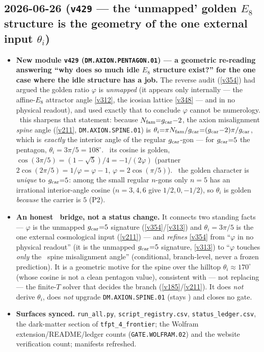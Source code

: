 \subsection*{2026-06-26 (\texttt{v429} --- the `unmapped' golden $E_8$ structure is the geometry of the one external input $\theta_i$)}
\begin{itemize}
\item \textbf{New module \texttt{v429} (\texttt{DM.AXION.PENTAGON.01}) --- a geometric re-reading answering
``why does so much idle $E_8$ structure exist?'' for the one case where the idle structure has a job.}
The reverse audit (\vref{v354}) had argued the golden ratio $\varphi$ is \emph{unmapped} (it appears only
internally --- the affine-$E_8$ attractor angle \vref{v312}, the icosian lattice \vref{v348} --- and in no
physical readout), and used exactly that to conclude $\varphi$ cannot be numerology. \mE\ this sharpens that
statement: because $N_{\mathrm{fam}}{=}g_{\mathrm{car}}{-}2$, the axion misalignment \emph{spine} angle (\vref{v211},
\texttt{DM.AXION.SPINE.01}) is $\theta_i{=}\pi N_{\mathrm{fam}}/g_{\mathrm{car}}{=}(g_{\mathrm{car}}{-}2)\pi/g_{\mathrm{car}}$, which is \emph{exactly}
the interior angle of the regular $g_{\mathrm{car}}$-gon --- for $g_{\mathrm{car}}{=}5$ the pentagon, $\theta_i{=}3\pi/5{=}108^\circ$.
\mE\ its cosine is golden, $\cos(3\pi/5){=}(1{-}\sqrt5)/4{=}{-}1/(2\varphi)$ (partner $2\cos(2\pi/5){=}1/\varphi
{=}\varphi{-}1$, $\varphi{=}2\cos(\pi/5)$). \mE\ the golden character is \emph{unique} to $g_{\mathrm{car}}{=}5$: among the
small regular $n$-gons only $n{=}5$ has an irrational interior-angle cosine ($n{=}3,4,6$ give $1/2,0,-1/2$), so
$\theta_i$ is golden \emph{because} the carrier is $5$ (P2).
\item \textbf{An honest \mC\ bridge, not a status change.} It connects two standing facts --- $\varphi$ is the
unmapped $g_{\mathrm{car}}{=}5$ signature (\vref{v354}/\vref{v313}) and $\theta_i{=}3\pi/5$ is the one external cosmological
input (\vref{v211}) --- and \emph{refines} \vref{v354} from ``$\varphi$ in no physical readout'' (it is the unmapped $g_{\mathrm{car}}{=}5$ signature, \vref{v313}) to ``$\varphi$
touches \emph{only} the \mC\ spine misalignment angle'' (conditional, branch-level, never a frozen prediction).
It is a geometric motive for the spine over the hilltop $\theta_i{\approx}170^\circ$ (whose cosine is not a clean
pentagon value), consistent with --- not replacing --- the finite-$T$ solver that decides the branch
(\vref{v185}/\vref{v211}). It does \emph{not} derive $\theta_i$, does \emph{not} upgrade
\texttt{DM.AXION.SPINE.01} (stays \mC) and closes no gate.
\item \textbf{Surfaces synced.} \texttt{run\_all.py}, \texttt{script\_registry.csv},
\texttt{status\_ledger.csv}, the dark-matter section of \texttt{tfpt\_4\_frontier}; the Wolfram
extension/README/ledger counts (\texttt{GATE.WOLFRAM.02}) and the website verification count; manifests refreshed.
\end{itemize}

